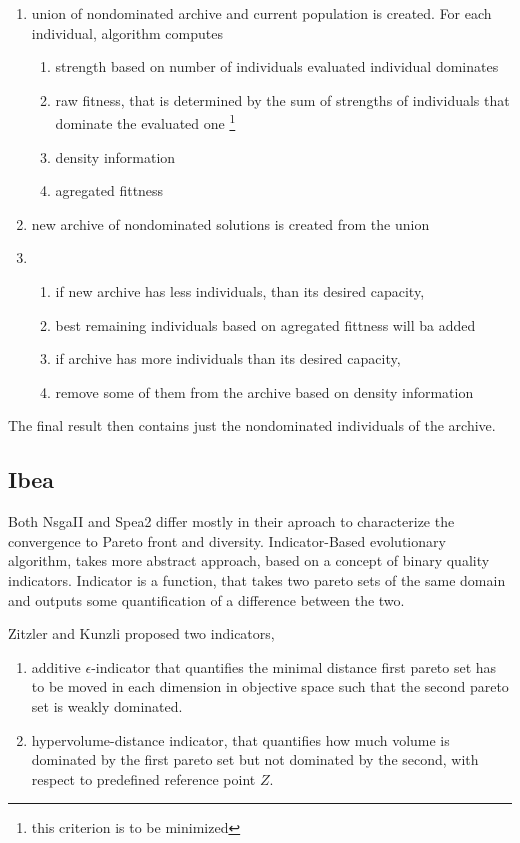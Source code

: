 \documentclass[12pt,oneside,draft]{fithesis2}
\begin{document}
\begin{enumerate}
\item	 union of nondominated archive and current population is created. For each individual, algorithm computes
	\begin{enumerate}
	\item strength based on number of individuals evaluated individual dominates
	\item raw fitness, that is determined by the sum of strengths of individuals that dominate the evaluated one \footnote{this criterion is to be minimized}
	\item density information
	\item agregated fittness
	\end{enumerate}
\item new archive of nondominated solutions is created from the union
\item   
	\begin{enumerate}
	\item if new archive has less individuals, than its desired capacity,
	\item best remaining individuals based on agregated fittness will ba added
  	\item if archive has more individuals than its desired capacity,
	\item remove some of them from the archive based on density information
	\end{enumerate}
\end{enumerate}
The final result then contains just the nondominated individuals of the archive.

\subsection{Ibea}
Both NsgaII and Spea2 differ mostly in their aproach to characterize the convergence to Pareto front and diversity. 
Indicator-Based evolutionary algorithm, takes more abstract approach, based on a concept of binary quality indicators.
Indicator is a function, that takes two pareto sets of the same domain and outputs some quantification of a difference between the two.

Zitzler and Kunzli proposed two indicators,
\begin{enumerate}
\item additive $\epsilon$-indicator that quantifies the minimal distance first pareto set has to be moved in each dimension in objective space such that the second pareto set is weakly dominated.

\item hypervolume-distance indicator, that quantifies how much volume is dominated by the first pareto set but not dominated by the second, with respect to predefined reference point $Z$.
\end{enumerate}
\end{document}
